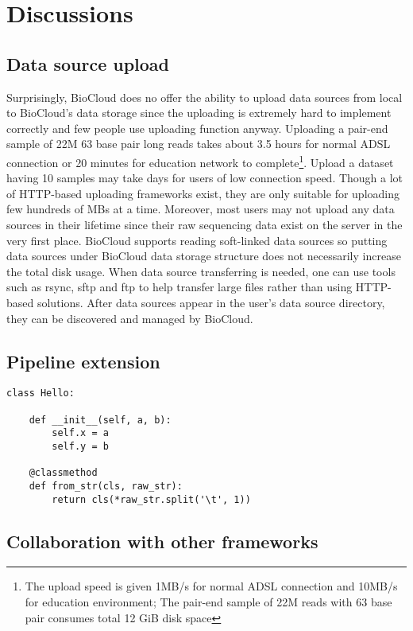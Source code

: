 \chapter{Discussions}
\label{c:discussion}

\section{Data source upload}

Surprisingly, BioCloud does no offer the ability to upload data sources from
local to BioCloud's data storage since the uploading is extremely hard to
implement correctly and few people use uploading function anyway. Uploading a
pair-end sample of 22M 63 base pair long reads takes about 3.5 hours for normal
ADSL connection or 20 minutes for education network to complete\footnote{The
upload speed is given 1MB/s for normal ADSL connection and 10MB/s for education
environment; The pair-end sample of 22M reads with 63 base pair consumes total
12 GiB disk space}. Upload a dataset having 10 samples may take days for users
of low connection speed. Though a lot of HTTP-based uploading frameworks exist,
they are only suitable for uploading few hundreds of MBs at a time. Moreover,
most users may not upload any data sources in their lifetime since their raw
sequencing data exist on the server in the very first place. BioCloud supports
reading soft-linked data sources so putting data sources under BioCloud data
storage structure does not necessarily increase the total disk usage. When data
source transferring is needed, one can use tools such as rsync, sftp and ftp to
help transfer large files rather than using HTTP-based solutions. After data
sources appear in the user's data source directory, they can be discovered and
managed by BioCloud.



\section{Pipeline extension}

\begin{lstlisting}
class Hello:

    def __init__(self, a, b):
        self.x = a
        self.y = b

    @classmethod
    def from_str(cls, raw_str):
        return cls(*raw_str.split('\t', 1))
\end{lstlisting}


\section{Collaboration with other frameworks}

